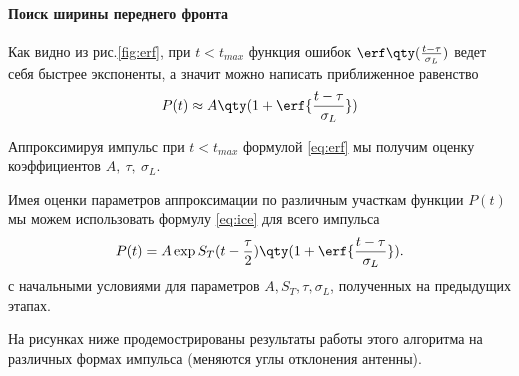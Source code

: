 \paragraph{Поиск ширины переднего фронта}%
Как видно из рис.\ref{fig:erf}, при $t<t_{max}$ функция ошибок
$\erf\qty(\frac{t - \tau}{\sigma_L})$ ведет себя
быстрее экспоненты, а значит можно написать приближенное равенство
\begin{equation}
    \label{eq:erf}
    P(t) \approx A \qty(1 + \erf{\frac{t - \tau}{\sigma_L}})
\end{equation}


Аппроксимируя импульс при $t<t_{max}$ формулой \eqref{eq:erf} мы получим оценку
коэффициентов $A,~\tau,~\sigma_L$. 

\label{par:etap_4_zakliuchitel_naia_approksimatsiia_}

 Имея оценки параметров аппроксимации по различным
участкам функции $P(t)$ мы можем использовать формулу  \eqref{eq:ice} для всего
импульса 
\begin{equation}
    \label{eq:ice}
    P(t) = A \exp{ S_T (t - \frac{\tau}{2})} \qty(1 + \erf{\frac{t-
    \tau}{\sigma_L}}).
\end{equation}
с начальными условиями для параметров $A, S_T, \tau, \sigma_L$, полученных на
предыдущих этапах. 


На рисунках ниже продемострированы результаты работы этого алгоритма на
различных формах импульса (меняются углы отклонения антенны).






